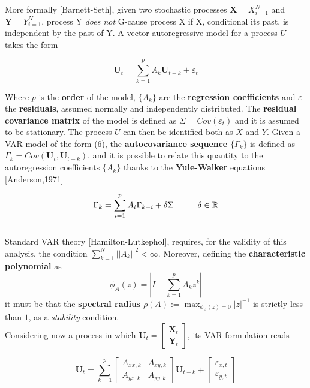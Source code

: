 \documentclass[a4paper]{article}
\begin{document}
More formally [Barnett-Seth], given two stochastic processes $ \textbf{X} = {X}_{i=1}^N $ and $ \textbf{Y} = {Y}_{i=1}^N $, process Y \textit{does not} G-cause process X if X, conditional its past, is independent by the past of Y. A vector autoregressive model for a process $U$ takes the form

\begin{equation}
\textbf{U}_t = \sum_{k=1}^{p} A_k \textbf{U}_{t-k} + \varepsilon_t 
\end{equation}



Where $p$ is the \textbf{order} of the model, $\{ A_k\}$ are the \textbf{regression coefficients} and $\varepsilon$ the \textbf{residuals}, assumed normally and independently distributed. The \textbf{ residual covariance matrix} of the model is defined as $ \Sigma = Cov(\varepsilon_t) $ and it is assumed to be stationary. The process $U$ can then be identified both as $X$ and $Y$. Given a VAR model of the form (6), the \textbf{autocovariance sequence} $ \{\Gamma_k\} $ is defined as $ \Gamma_k = Cov(\textbf{U}_t,\textbf{U}_{t-k})$, and it is possible to relate this quantity to the autoregression coefficients $\{ A_k\}$ thanks to the \textbf{Yule-Walker} equations [Anderson,1971]

\begin{equation}
\Gamma_k = \sum_{i=1}^{p} A_i \Gamma_{k-i} + \delta \Sigma \hspace{1 cm }  \delta \in \mathbb{R}
\end{equation}\\

Standard VAR theory [Hamilton-Lutkephol], requires, for the validity of this analysis, the condition $ \sum_{k=1}^{N}||A_k||^2 < \infty $. Moreover, defining the \textbf{characteristic polynomial} as 
$$ \phi_A(z)= \left| I - \sum_{k=1}^{p} A_k z^k \right| $$
it must be that the \textbf{spectral radius} $\rho(A) := \max_{\phi_A(z)=0}|z|^{-1}$ is strictly less than $1$, as a \textit{stability} condition.
\\

Considering now a process in which $ \textbf{U}_t = \begin{bmatrix} \textbf{X}_t  \\  \textbf{Y}_t \end{bmatrix} $, its VAR formulation reads

\begin{equation}
\textbf{U}_t = \sum_{k=1}^{p} \begin{bmatrix} A_{xx,k}  &  A_{xy,k} \\  A_{yx,k}  & A_{yy,k} \end{bmatrix} \textbf{U}_{t-k} + \begin{bmatrix} \varepsilon_{x,t}  \\  \varepsilon_{y,t} \end{bmatrix}
\end{equation}
\end{document}

